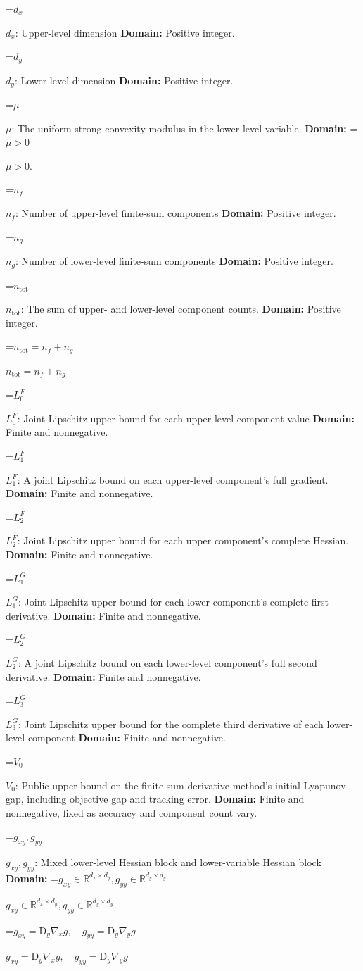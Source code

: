 \documentclass[10pt,a4paper]{article}
\newcommand{\AtlasMath}[1]{\par\begingroup\centering\setbox0=\hbox{$\displaystyle #1$}\ifdim\wd0>1.4\linewidth\typeout{ATLAS WIDE FORMULA: \the\wd0}\fi\ifdim\wd0>\linewidth\resizebox{\linewidth}{!}{\box0}\else\box0\fi\par\endgroup}
\newcommand{\AtlasInlineMath}[1]{\begingroup\setbox0=\hbox{$#1$}\ifdim\wd0>.4\linewidth\endgroup\AtlasMath{#1}\else\endgroup$#1$\fi}
\begin{document}
\AtlasInlineMath{d_x}: Upper-level dimension \textbf{Domain:} Positive integer.

\AtlasInlineMath{d_y}: Lower-level dimension \textbf{Domain:} Positive integer.

\AtlasInlineMath{\mu}: The uniform strong-convexity modulus in the lower-level variable. \textbf{Domain:} \AtlasInlineMath{\mu>0}.

\AtlasInlineMath{n_f}: Number of upper-level finite-sum components \textbf{Domain:} Positive integer.

\AtlasInlineMath{n_g}: Number of lower-level finite-sum components \textbf{Domain:} Positive integer.

\AtlasInlineMath{n_{\mathrm{tot}}}: The sum of upper- and lower-level component counts. \textbf{Domain:} Positive integer.

\AtlasInlineMath{n_{\mathrm{tot}}=n_f+n_g}

\AtlasInlineMath{L^F_0}: Joint Lipschitz upper bound for each upper-level component value \textbf{Domain:} Finite and nonnegative.

\AtlasInlineMath{L^F_1}: A joint Lipschitz bound on each upper-level component’s full gradient. \textbf{Domain:} Finite and nonnegative.

\AtlasInlineMath{L^F_2}: Joint Lipschitz upper bound for each upper component's complete Hessian. \textbf{Domain:} Finite and nonnegative.

\AtlasInlineMath{L^G_1}: Joint Lipschitz upper bound for each lower component's complete first derivative. \textbf{Domain:} Finite and nonnegative.

\AtlasInlineMath{L^G_2}: A joint Lipschitz bound on each lower-level component’s full second derivative. \textbf{Domain:} Finite and nonnegative.

\AtlasInlineMath{L^G_3}: Joint Lipschitz upper bound for the complete third derivative of each lower-level component \textbf{Domain:} Finite and nonnegative.

\AtlasInlineMath{V_0}: Public upper bound on the finite-sum derivative method's initial Lyapunov gap, including objective gap and tracking error. \textbf{Domain:} Finite and nonnegative, fixed as accuracy and component count vary.

\AtlasInlineMath{g_{xy},g_{yy}}: Mixed lower-level Hessian block and lower-variable Hessian block \textbf{Domain:} \AtlasInlineMath{g_{xy}\in\mathbb R^{d_x\times d_y},g_{yy}\in\mathbb R^{d_y\times d_y}}.

\AtlasInlineMath{g_{xy}=\mathrm D_y\nabla_xg,\quad g_{yy}=\mathrm D_y\nabla_yg}
\end{document}
